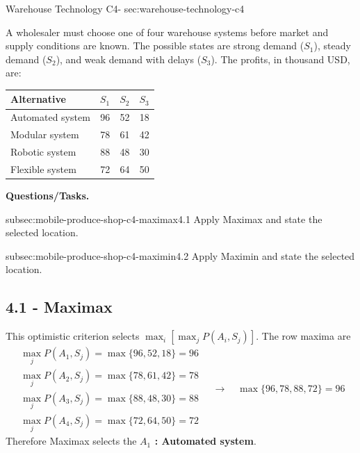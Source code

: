 	\sectionScored
	{Warehouse Technology}
	{C4-}
	{sec:warehouse-technology-c4}
	{
	A wholesaler must choose one of four warehouse systems before market and supply conditions are known. The possible states are strong demand ($S_1$), steady demand ($S_2$), and weak demand with delays ($S_3$). The profits, in thousand USD, are:
	\begin{center}
	\begin{tabular}{lrrr}
	\toprule
	Alternative & $S_1$ & $S_2$ & $S_3$ \\
	\midrule
	Automated system & 96 & 52 & 18 \\
	Modular system & 78 & 61 & 42 \\
	Robotic system & 88 & 48 & 30 \\
	Flexible system & 72 & 64 & 50 \\
	\bottomrule
	\end{tabular}
	\end{center}

	\textbf{Questions/Tasks.}
	\begin{enumerate}
		\CriterionTask
		{subsec:mobile-produce-shop-c4-maximax}{4.1}
		{Apply Maximax and state the selected location. }

		\CriterionTask
		{subsec:mobile-produce-shop-c4-maximin}{4.2}
		{Apply Maximin and state the selected location. }
	\end{enumerate}

	\label{subsec:warehouse-technology-c4-maximax}
	\subsection*{4.1 - Maximax }
	
	This optimistic criterion selects
	\(\max_i[\max_j P(A_i,S_j)]\). The row maxima are
	\[
	\begin{array}{c}
		\max_jP(A_1,S_j)=\max\{96,52,18\}=96 \\
		\max_jP(A_2,S_j)=\max\{78,61,42\}=78 \\
		\max_jP(A_3,S_j)=\max\{88,48,30\}=88 \\
		\max_jP(A_4,S_j)=\max\{72,64,50\}=72
	\end{array}
	\quad \longrightarrow \quad
	\max\{96,78,88,72\}=96
	\]
	Therefore Maximax selects the \textbf{\boldmath\(A_1\) : Automated system}.

	\vspace{-5mm}
	
}

